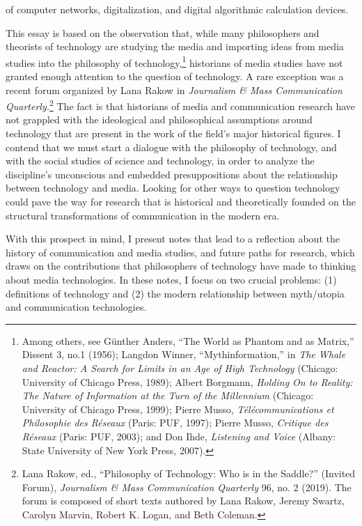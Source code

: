 \documentclass{tufte-handout}
\begin{document}
\noindent of computer networks,
digitalization, and digital algorithmic calculation devices.

This essay is based on the observation that, while many philosophers and
theorists of technology are studying the media and importing ideas from
media studies into the philosophy of
technology,\footnote{Among others, see Günther Anders, ``The World as Phantom and as
  Matrix,'' Dissent 3, no.1 (1956); Langdon Winner, ``Mythinformation,''
  in \emph{The Whale and Reactor: A Search for Limits in an Age of High
  Technology} (Chicago: University of Chicago Press, 1989); Albert
  Borgmann, \emph{Holding On to Reality: The Nature of Information at
  the Turn of the Millennium} (Chicago: University of Chicago Press,
  1999); Pierre Musso, \emph{Télécommunications et Philosophie des
  Réseaux} (Paris: PUF, 1997); Pierre Musso, \emph{Critique des Réseaux}
  (Paris: PUF, 2003); and Don Ihde, \emph{Listening and Voice} (Albany:
  State University of New York Press, 2007).
} historians of media
studies have not granted enough attention to the question of technology.
A rare exception was a recent forum organized by Lana Rakow in
\emph{Journalism \& Mass Communication
Quarterly.}\footnote{Lana Rakow, ed., ``Philosophy of Technology: Who is in the Saddle?''
  (Invited Forum), \emph{Journalism \& Mass Communication Quarterly} 96,
  no. 2 (2019). The forum is composed of short texts authored by Lana
  Rakow, Jeremy Swartz, Carolyn Marvin, Robert K. Logan, and Beth
  Coleman.
} The fact is that
historians of media and communication research have not grappled with
the ideological and philosophical assumptions around technology that are
present in the work of the field's major historical figures. I contend
that we must start a dialogue with the philosophy of technology, and
with the social studies of science and technology, in order to analyze
the discipline's unconscious and embedded presuppositions about the
relationship between technology and media. Looking for other ways to
question technology could pave the way for research that is historical
and theoretically founded on the structural transformations of
communication in the modern era.

With this prospect in mind, I present notes that lead to a reflection
about the history of communication and media studies, and future paths
for research, which draws on the contributions that philosophers of
technology have made to thinking about media technologies. In these
notes, I focus on two crucial problems: (1) definitions of technology
and (2) the modern relationship between myth/utopia and communication
technologies.
\end{document}
